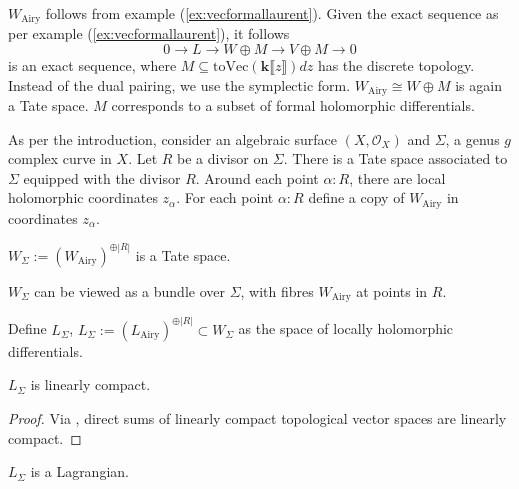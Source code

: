         \(W_{\mathrm{Airy}}\) follows from example (\ref{ex:vecformallaurent}).
        Given the exact sequence as per example (\ref{ex:vecformallaurent}), it follows
        \[ 0 \rightarrow L \rightarrow W \oplus M \rightarrow V \oplus M  \rightarrow 0 \]
        is an exact sequence, where \( M \subseteq \mathrm{toVec}( \mathbf{k}\lBrack z \rBrack) dz\) has the discrete topology. Instead of the  dual pairing, we use the symplectic form. \( W_{\mathrm{Airy}} \cong W \oplus M\) is again a Tate space. \(M\) corresponds to a subset of formal holomorphic differentials.
        
            
            
        As per the introduction, consider an algebraic surface \( (X,\mathcal{O}_X)\) and  \( \Sigma \), a genus \(g\)  complex curve in \(X\). Let \(R\) be a divisor on \(\Sigma\). There is a Tate space associated to \( \Sigma\) equipped with the divisor \(R\). Around each point \( \alpha : R\), there are local holomorphic  coordinates \( z_\alpha\).
        For each point \( \alpha : R\) define a copy of \(W_{\mathrm{Airy}}\) in coordinates \( z_\alpha\).
        
        \begin{prop}
        \( W_\Sigma := (W_{\mathrm{Airy}})^{\oplus |R|}\) is a Tate space.
        \end{prop}
        
        \( W_{\Sigma}\) can be viewed as a bundle over \(\Sigma\), with fibres \( W_{\mathrm{Airy}}\) at points in \(R\).
    
        \begin{defn}
        Define \( L_\Sigma \), \( L_\Sigma := (L_{\mathrm{Airy}})^{\oplus|R|} \subset W_\Sigma \) as the space of locally holomorphic differentials.
        \end{defn} 
        
        \begin{prop}
        \( L_\Sigma\) is linearly compact.
        \end{prop}

        \begin{proof} Via \cite{lefschetz1942algebraic}, direct sums of linearly compact topological vector spaces are linearly compact.
        \end{proof}

        \begin{prop}
        \( L_\Sigma\) is a Lagrangian.
        \end{prop}
        
